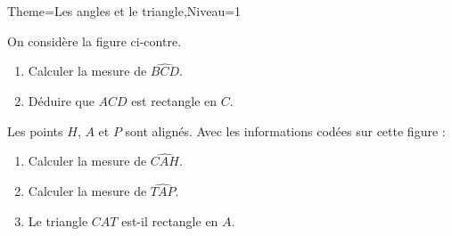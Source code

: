 \documentclass[a4paper,12pt]{article}
\begin{document}
\begin{Maquette}[Fiche]{Theme=Les angles et le triangle,Niveau=1}
\begin{exercice}
\begin{minipage}{0.6\linewidth}
On considère la figure ci-contre.
\begin{enumerate}
\item Calculer la mesure de $\widehat{BCD}$.
\item Déduire que $ACD$ est rectangle en $C$.
\end{enumerate}
\end{minipage}%
\begin{minipage}{0.4\linewidth}
\end{minipage}
\end{exercice}

\begin{exercice}
\begin{minipage}{0.6\linewidth}
Les points $H$, $A$ et $P$ sont alignés. Avec les informations codées sur cette figure :
\begin{enumerate}
\item Calculer la mesure de $\widehat{CAH}$.
\item Calculer la mesure de $\widehat{TAP}$.
\item Le triangle $CAT$ est-il rectangle en $A$.
\end{enumerate}
\end{minipage}%
\begin{minipage}{0.4\linewidth}
\end{minipage}
\end{exercice}


\end{Maquette}
\end{document}
